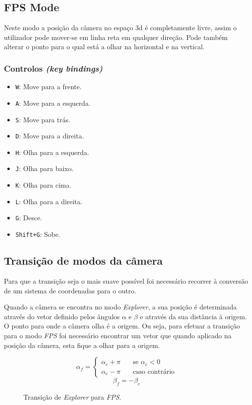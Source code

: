 \documentclass[a4paper]{article}
\begin{document}
\subsection{FPS Mode}

Neste modo a posição da câmera no espaço 3d é completamente livre, assim o utilizador pode mover-se em linha reta em qualquer direção. Pode também alterar o ponto para o qual está a olhar na horizontal e na vertical.

\subsubsection{Controlos \textit{(key bindings)}}

\begin{itemize}
    \item \texttt{W}: Move para a frente.
    \item \texttt{A}: Move para a esquerda.
    \item \texttt{S}: Move para trás.
    \item \texttt{D}: Move para a direita.
    \item \texttt{H}: Olha para a esquerda.
    \item \texttt{J}: Olha para baixo.
    \item \texttt{K}: Olha para cima.
    \item \texttt{L}: Olha para a direita.
    \item \texttt{G}: Desce.
    \item \texttt{Shift+G}: Sobe.
\end{itemize}

\subsection{Transição de modos da câmera}

Para que a transição seja o mais suave possível foi necessário recorrer à conversão de um sistema de coordenadas para o outro.

Quando a câmera se encontra no modo \textit{Explorer}, a sua posição é determinada através do vetor definido pelos ângulos $\alpha$ e $\beta$ e através da sua distância à origem. O ponto para onde a câmera olha é a origem. Ou seja, para efetuar a transição para o modo \textit{FPS} foi necessário encontrar um vetor que quando aplicado na posição da câmera, esta fique a olhar para a origem.

\begin{figure}[H]
    \[
        \alpha_f =
        \begin{cases}
            \alpha_e + \pi & \quad \text{se } \alpha_e < 0\\
            \alpha_e - \pi & \quad \text{caso contrário}
        \end{cases}
    \]
    \[
        \beta_f = -\beta_e
    \]
    \caption{Transição de \textit{Explorer} para \textit{FPS}.}
\end{figure}
\end{document}
